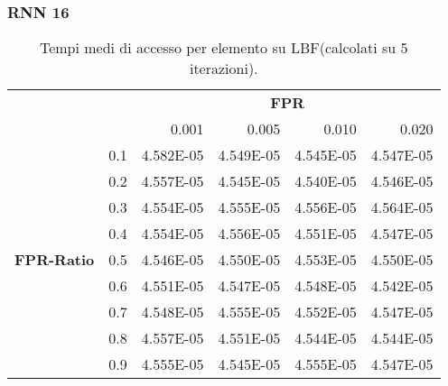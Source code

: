 \documentclass[4apaper,11pt]{report}
\begin{document}
    \subsubsection{RNN 16}
    \begin{table}[H]
        \centering
        \begin{tabular}{llrrrr}
        \toprule
        {} & & \multicolumn{4}{c}{\textbf{FPR}}\\
        {} & &    0.001 &     0.005 &     0.010 &     0.020 \\
        \midrule
        \multirow{9}{*}{\textbf{FPR-Ratio}} & 0.1& 4.582E-05 & 4.549E-05 & 4.545E-05 & 4.547E-05 \\
        &0.2& 4.557E-05 & 4.545E-05 & 4.540E-05 & 4.546E-05 \\
        &0.3& 4.554E-05 & 4.555E-05 & 4.556E-05 & 4.564E-05 \\
        &0.4& 4.554E-05 & 4.556E-05 & 4.551E-05 & 4.547E-05 \\
        &0.5& 4.546E-05 & 4.550E-05 & 4.553E-05 & 4.550E-05 \\
        &0.6& 4.551E-05 & 4.547E-05 & 4.548E-05 & 4.542E-05 \\
        &0.7& 4.548E-05 & 4.555E-05 & 4.552E-05 & 4.547E-05 \\
        &0.8& 4.557E-05 & 4.551E-05 & 4.544E-05 & 4.544E-05 \\
        &0.9& 4.555E-05 & 4.545E-05 & 4.555E-05 & 4.547E-05 \\
        \bottomrule
        \end{tabular}
        \caption{Tempi medi di accesso per elemento su LBF(calcolati su 5 iterazioni).}
    \end{table}
\end{document}
